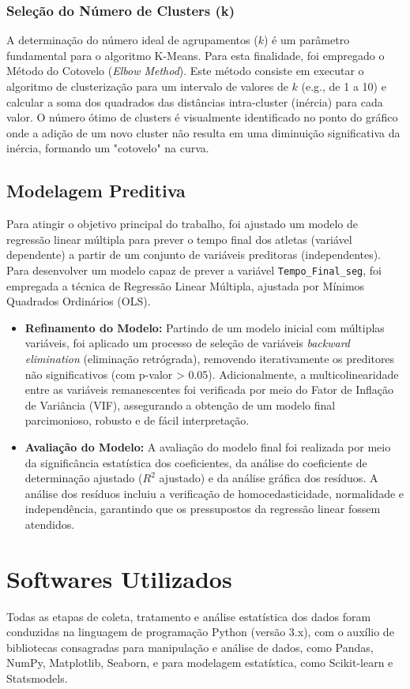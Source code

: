 \subsubsection{Seleção do Número de Clusters (k)}

A determinação do número ideal de agrupamentos ($k$) é um parâmetro fundamental para o algoritmo K-Means. Para esta finalidade, foi empregado o Método do Cotovelo (\textit{Elbow Method})\citep{thorndike1953}. Este método consiste em executar o algoritmo de clusterização para um intervalo de valores de $k$ (e.g., de 1 a 10) e calcular a soma dos quadrados das distâncias intra-cluster (inércia) para cada valor. O número ótimo de clusters é visualmente identificado no ponto do gráfico onde a adição de um novo cluster não resulta em uma diminuição significativa da inércia, formando um "cotovelo" na curva.


\subsection{Modelagem Preditiva}
Para atingir o objetivo principal do trabalho, foi ajustado um modelo de regressão linear múltipla para prever o tempo final dos atletas (variável dependente) a partir de um conjunto de variáveis preditoras (independentes). Para desenvolver um modelo capaz de prever a variável \texttt{Tempo\_Final\_seg}, foi empregada a técnica de Regressão Linear Múltipla, ajustada por Mínimos Quadrados Ordinários (OLS).
\begin{itemize}
    \item \textbf{Refinamento do Modelo:} Partindo de um modelo inicial com múltiplas variáveis, foi aplicado um processo de seleção de variáveis \emph{backward elimination} (eliminação retrógrada), removendo iterativamente os preditores não significativos (com p-valor > 0.05). Adicionalmente, a multicolinearidade entre as variáveis remanescentes foi verificada por meio do Fator de Inflação de Variância (VIF), assegurando a obtenção de um modelo final parcimonioso, robusto e de fácil interpretação.
    \item \textbf{Avaliação do Modelo:} A avaliação do modelo final foi realizada por meio da significância estatística dos coeficientes, da análise do coeficiente de determinação ajustado ($R^2$ ajustado) e da análise gráfica dos resíduos. A análise dos resíduos incluiu a verificação de homocedasticidade, normalidade e independência, garantindo que os pressupostos da regressão linear fossem atendidos.
\end{itemize}

\section{Softwares Utilizados}

Todas as etapas de coleta, tratamento e análise estatística dos dados foram conduzidas na linguagem de programação Python (versão 3.x), com o auxílio de bibliotecas consagradas para manipulação e análise de dados, como Pandas, NumPy, Matplotlib, Seaborn, e para modelagem estatística, como Scikit-learn e Statsmodels.

